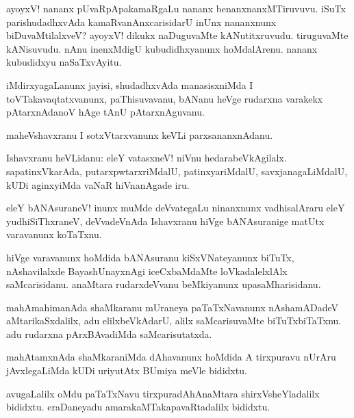\documentclass{article}
\begin{document}
\begin{mn}
ayoyxV! nananx pUvaRpApakamaRgaLu nananx benanxnanxMTiruvuvu. iSuTx parishudadhxvAda 
kamaRvanAnxcarisidarU inUnx nananxnunx biDuvaMtilalxveV? ayoyxV! dikukx naDuguvaMte kANutitxruvudu.
tiruguvaMte kANisuvudu. nAnu inenxMdigU kubudidhxyanunx hoMdalArenu. nananx kubudidxyu naSaTxvAyitu.
\end{mn}

\begin{mn}
iMdirxyagaLanunx jayisi, shudadhxvAda manasisxniMda I toVTakavaqtatxvanunx, paThisuvavanu, bANanu 
heVge rudarxna varakekx pAtarxnAdanoV hAge tAnU pAtarxnAguvanu.
\end{mn}

\begin{mn}
maheVshavxranu I sotxVtarxvanunx keVLi parxsananxnAdanu.
\end{mn}

\begin{mn}
Ishavxranu heVLidanu: eleY vatasxneV! niVnu hedarabeVkAgilalx. sapatinxVkarAda, 
putarxpwtarxriMdalU, patinxyariMdalU, savxjanagaLiMdalU, kUDi aginxyiMda vaNaR hiVnanAgade iru.
\end{mn}

\begin{mn}
eleY bANAsuraneV! inunx muMde deVvategaLu ninanxnunx vadhisalAraru eleY yudhiSiThxraneV, 
deVvadeVnAda Ishavxranu hiVge bANAsuranige matUtx varavanunx koTaTxnu.
\end{mn}

\begin{mn}
hiVge varavanunx hoMdida bANAsuranu kiSxVNateyanunx biTuTx, nAshavilalxde BayashUnayxnAgi 
iceCxbaMdaMte loVkadalelxlAlx saMcarisidanu. anaMtara rudarxdeVvanu beMkiyanunx upasaMharisidanu.
\end{mn}

\begin{mn}
mahAmahimanAda shaMkaranu mUraneya paTaTxNavanunx nAshamADadeV aMtarikaSxdalilx, adu 
elilxbeVkAdarU, alilx saMcarisuvaMte biTuTxbiTaTxnu. adu rudarxna pArxBAvadiMda saMcarisutatxda.
\end{mn}

\begin{mn}
mahAtamxnAda shaMkaraniMda dAhavanunx hoMdida A tirxpuravu nUrAru jAvxlegaLiMda kUDi uriyutAtx
BUmiya meVle bididxtu.
\end{mn}

\begin{mn}
avugaLalilx oMdu paTaTxNavu tirxpuradAhAnaMtara shirxVsheYladalilx bididxtu. eraDaneyadu
amarakaMTakapavaRtadalilx bididxtu.
\end{mn}
\end{document}
